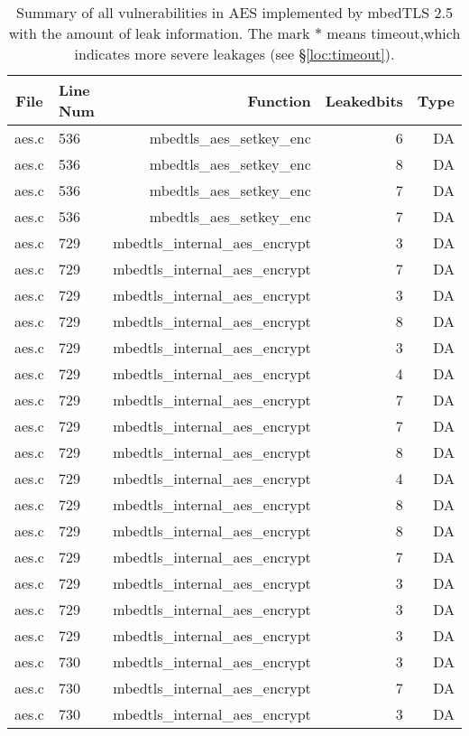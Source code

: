 \begin{table}%
\centering\tiny
\caption{Summary of all vulnerabilities in AES implemented by mbedTLS 2.5 with the amount of leak information. The mark $*$ means timeout,which indicates more severe leakages (see \S\ref{loc:timeout}).}\label{tab:AESmbedTLS}
\begin{tabular}{clrrr}
\hline
\textbf{File} & \textbf{Line Num} & \textbf{Function} & \textbf{Leakedbits} & \textbf{Type} \\\hline
aes.c& 536&mbedtls\_aes\_setkey\_enc&6 &DA\\
aes.c& 536&mbedtls\_aes\_setkey\_enc&8 &DA\\
aes.c& 536&mbedtls\_aes\_setkey\_enc&7 &DA\\
aes.c& 536&mbedtls\_aes\_setkey\_enc&7 &DA\\
aes.c& 729&mbedtls\_internal\_aes\_encrypt&3 &DA\\
aes.c& 729&mbedtls\_internal\_aes\_encrypt&7 &DA\\
aes.c& 729&mbedtls\_internal\_aes\_encrypt&3 &DA\\
aes.c& 729&mbedtls\_internal\_aes\_encrypt&8 &DA\\
aes.c& 729&mbedtls\_internal\_aes\_encrypt&3 &DA\\
aes.c& 729&mbedtls\_internal\_aes\_encrypt&4 &DA\\
aes.c& 729&mbedtls\_internal\_aes\_encrypt&7 &DA\\
aes.c& 729&mbedtls\_internal\_aes\_encrypt&7 &DA\\
aes.c& 729&mbedtls\_internal\_aes\_encrypt&8 &DA\\
aes.c& 729&mbedtls\_internal\_aes\_encrypt&4 &DA\\
aes.c& 729&mbedtls\_internal\_aes\_encrypt&8 &DA\\
aes.c& 729&mbedtls\_internal\_aes\_encrypt&8 &DA\\
aes.c& 729&mbedtls\_internal\_aes\_encrypt&7 &DA\\
aes.c& 729&mbedtls\_internal\_aes\_encrypt&3 &DA\\
aes.c& 729&mbedtls\_internal\_aes\_encrypt&3 &DA\\
aes.c& 729&mbedtls\_internal\_aes\_encrypt&3 &DA\\
aes.c& 730&mbedtls\_internal\_aes\_encrypt&3 &DA\\
aes.c& 730&mbedtls\_internal\_aes\_encrypt&7 &DA\\
aes.c& 730&mbedtls\_internal\_aes\_encrypt&3 &DA\\

\end{tabular}
\end{table}
